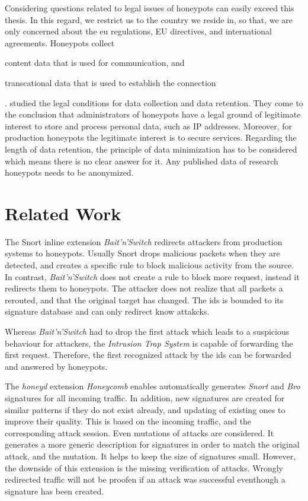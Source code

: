 Considering questions related to legal issues of honeypots can easily exceed this thesis.
In this regard, we restrict us to the country we reside in, so that, we are only concerned about the \ac{eu} regulations, EU directives, and international agreements.
Honeypots collect
\begin{enumerate*}[label=(\roman*)]
    \item content data that is used for communication, and
    \item transcational data that is used to establish the connection
\end{enumerate*}.
\citet{sokol2017} studied the legal conditions for data collection and data retention. They come to the conclusion that administrators of honeypots have a legal ground of legitimate interest to store and process personal data, such as IP addresses. Moreover, for production honeypots the legitimate interest is to secure services. Regarding the length of data retention, the principle of data minimization has to be considered which means there is no clear answer for it. Any published data of research honeypots needs to be anonymized.

\section{Related Work}

The Snort \cite{caswell2003} inline extension \textit{Bait'n'Switch} \cite{gonzalez2003} redirects attackers from production systems to honeypots.
Usually Snort drops malicious packets when they are detected, and creates a specific rule to block malicious activity from the source.
In contrast, \textit{Bait'n'Switch} does not create a rule to block more request, instead it redirects them to honeypots.
The attacker does not realize that all packets a rerouted, and that the original target has changed.
The \ac{ids} is bounded to its signature database and can only redirect know attakcks.\cite{Diebold2005}

Whereas \textit{Bait'n'Switch} had to drop the first attack which leads to a suspicious behaviour for attackers, the \textit{Intrusion Trap System} \cite{takemori2003} is capable of forwarding the first request.
Therefore, the first recognized attack by the \ac{ids} can be forwarded and answered by honeypots. \cite{Diebold2005}

The \textit{honeyd} \cite{Provos2003} extension \textit{Honeycomb} \cite{kreibich2004} enables automatically generates \textit{Snort} and \textit{Bro} \cite{paxson1999} signatures for all incoming traffic.
In addition, new signatures are created for similar patterns if they do not exist already, and updating of existing ones to improve their quality.
This is based on the incoming traffic, and the corresponding attack session.
Even mutations of attacks are considered.
It generates a more generic description for signatures in order to match the original attack, and the mutation.
It helps to keep the size of signatures small.
However, the downside of this extension is the missing verification of attacks.
Wrongly redirected traffic will not be proofen if an attack was successful eventhough a signature has been created. \cite{Diebold2005}
